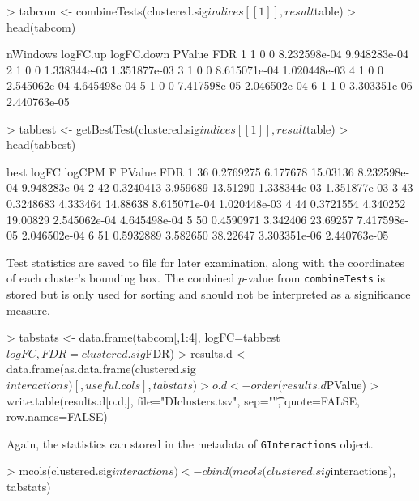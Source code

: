 \documentclass[12pt]{report}
\renewenvironment{Schunk}{\vspace{0pt}}{\vspace{0pt}}
\newcommand{\code}[1]{{\small\texttt{#1}}}
\begin{document}
\begin{Schunk}
\begin{Sinput}
> tabcom <- combineTests(clustered.sig$indices[[1]], result$table)
> head(tabcom)
\end{Sinput}
\begin{Soutput}
  nWindows logFC.up logFC.down       PValue          FDR
1        1        0          0 8.232598e-04 9.948283e-04
2        1        0          0 1.338344e-03 1.351877e-03
3        1        0          0 8.615071e-04 1.020448e-03
4        1        0          0 2.545062e-04 4.645498e-04
5        1        0          0 7.417598e-05 2.046502e-04
6        1        1          0 3.303351e-06 2.440763e-05
\end{Soutput}
\begin{Sinput}
> tabbest <- getBestTest(clustered.sig$indices[[1]], result$table)
> head(tabbest)
\end{Sinput}
\begin{Soutput}
  best     logFC   logCPM        F       PValue          FDR
1   36 0.2769275 6.177678 15.03136 8.232598e-04 9.948283e-04
2   42 0.3240413 3.959689 13.51290 1.338344e-03 1.351877e-03
3   43 0.3248683 4.333464 14.88638 8.615071e-04 1.020448e-03
4   44 0.3721554 4.340252 19.00829 2.545062e-04 4.645498e-04
5   50 0.4590971 3.342406 23.69257 7.417598e-05 2.046502e-04
6   51 0.5932889 3.582650 38.22647 3.303351e-06 2.440763e-05
\end{Soutput}
\end{Schunk}

Test statistics are saved to file for later examination, along with the coordinates of each cluster's bounding box.
The combined $p$-value from \code{combineTests} is stored but is only used for sorting and should not be interpreted as a significance measure.

\begin{Schunk}
\begin{Sinput}
> tabstats <- data.frame(tabcom[,1:4], logFC=tabbest$logFC, FDR=clustered.sig$FDR)
> results.d <- data.frame(as.data.frame(clustered.sig$interactions)[,useful.cols], tabstats)
> o.d <- order(results.d$PValue)
> write.table(results.d[o.d,], file="DIclusters.tsv", sep="\t", quote=FALSE, row.names=FALSE)
\end{Sinput}
\end{Schunk}

Again, the statistics can stored in the metadata of \code{GInteractions} object.

\begin{Schunk}
\begin{Sinput}
> mcols(clustered.sig$interactions) <- cbind(mcols(clustered.sig$interactions), tabstats)
\end{Sinput}
\end{Schunk}
\end{document}

